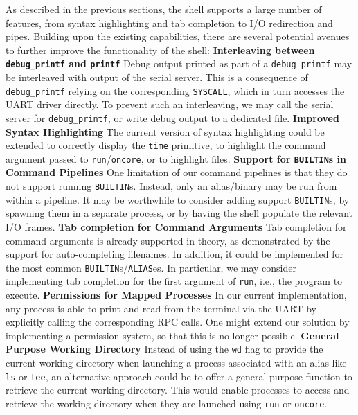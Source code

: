 As described in the previous sections, the shell supports a large number of features, from syntax highlighting and tab completion to I/O redirection and pipes. Building upon the existing capabilities, there are several potential avenues to further improve the functionality of the shell:
\bigbreak
\textbf{Interleaving between \texttt{debug\_printf} and \texttt{printf}} Debug output printed as part of a \texttt{debug\_printf} may be interleaved with output of the serial server. This is a consequence of \texttt{debug\_printf} relying on the corresponding \texttt{SYSCALL}, which in turn accesses the UART driver directly. To prevent such an interleaving, we may call the serial server for \texttt{debug\_printf}, or write debug output to a dedicated file.
\bigbreak
\textbf{Improved Syntax Highlighting} The current version of syntax highlighting could be extended to correctly display the \texttt{time} primitive, to highlight the command argument passed to \texttt{run}/\texttt{oncore}, or to highlight files.
\bigbreak
\textbf{Support for \texttt{BUILTIN}s in Command Pipelines} One limitation of our command pipelines is that they do not support running \texttt{BUILTIN}s. Instead, only an alias/binary may be run from within a pipeline. It may be worthwhile to consider adding support \texttt{BUILTIN}s, by spawning them in a separate process, or by having the shell populate the relevant I/O frames.
\bigbreak
\textbf{Tab completion for Command Arguments} Tab completion for command arguments is already supported in theory, as demonstrated by the support for auto-completing filenames. In addition, it could be implemented for the most common \texttt{BUILTIN}s/\texttt{ALIAS}es. In particular, we may consider implementing tab completion for the first argument of \texttt{run}, i.e., the program to execute.
\bigbreak
\textbf{Permissions for Mapped Processes} In our current implementation, any process is able to print and read from the terminal via the UART by explicitly calling the corresponding RPC calls. One might extend our solution by implementing a permission system, so that this is no longer possible.
\bigbreak
\textbf{General Purpose Working Directory} Instead of using the \texttt{\-\phantom\-wd} flag to provide the current working directory when launching a process associated with an alias like \texttt{ls} or \texttt{tee}, an alternative approach could be to offer a general purpose function to retrieve the current working directory. This would enable processes to access and retrieve the working directory when they are launched using \texttt{run} or \texttt{oncore}. 

